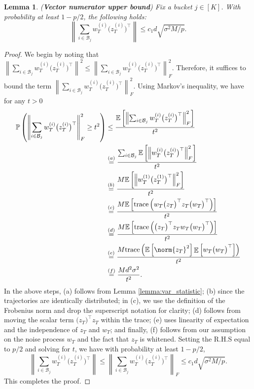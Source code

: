 \documentclass[letterpaper, 11 pt]{article}
\newcommand{\mc}{\mathcal}
\newcommand{\normlr}[1]{\left\lVert#1\right\rVert}
\newcommand{\tr}[1]{\text{trace}\left( #1 \right)}
\DeclareMathOperator{\E}{\mathbb{E}}
\newtheorem{lemma}{Lemma}
\begin{document}
\begin{lemma} (\textbf{Vector numerator upper bound}) Fix a bucket $j \in [K]$. With probability at least $1 - p/2$, the following holds:
$$\normlr{\sum_{i \in \mc{B}_j} w_T^{(i)}\big(z_T^{(i)}\big)^{\top}} \leq c_1 d \sqrt{\sigma^2 M/p}.$$
\end{lemma}
\begin{proof}
    We begin by noting that $\normlr{\sum_{i \in \mc{B}_j} w_T^{(i)}\big(z_T^{(i)}\big)^{\top}}^2 \leq \normlr{\sum_{i \in \mc{B}_j} w_T^{(i)}\big(z_T^{(i)}\big)^{\top}}_F^2$. Therefore, it suffices to bound the term $\normlr{\sum_{i \in \mc{B}_j} w_T^{(i)}\big(z_T^{(i)}\big)^{\top}}_F^2$. Using Markov's inequality, we have for any $t > 0$
    \begin{align}
        \mathbb{P}\left(\normlr{\sum_{i \in \mc{B}_j} w_T^{(i)}\big(z_T^{(i)}\big)^{\top}}_F^2 \geq t^2\right) & \leq 
        \frac{\mathbb{E}\left[ \normlr{\sum_{i \in \mc{B}_j} w_T^{(i)}\big(z_T^{(i)}\big)^{\top}}_F^2\right]}{t^2} \label{eqn:vec_num_1}\\
        & \overset{(a)}{=} \frac{\sum_{i \in \mc{B}_j} \mathbb{E}\left[ \normlr{w_T^{(i)}\big(z_T^{(i)}\big)^{\top}}_F^2\right]}{t^2} \nonumber\\
        & \overset{(b)}{=} \frac{M \mathbb{E}\left[ \normlr{w_T^{(1)}\big(z_T^{(1)}\big)^{\top}}_F^2\right]}{t^2} \nonumber\\
        & \overset{(c)}{=} \frac{M \mathbb{E}\left[ \tr{w_T\big(z_T\big)^{\top}z_T\big(w_T\big)^{\top}}\right]}{t^2} \nonumber\\
        & \overset{(d)}{=} \frac{M \mathbb{E}\left[ \tr{\big(z_T\big)^{\top}z_T w_T\big(w_T\big)^{\top}}\right]}{t^2} \nonumber\\
        & \overset{(e)}{=} \frac{M \tr{\mathbb{E}\left[ \norm{z_T}^2 \right] \E\left[w_T\big(w_T\big)^{\top} \right]}}{t^2} \nonumber\\
        & \overset{(f)}{=} \frac{M d^2 \sigma^2}{t^2}. \label{eqn:frob_norm_bnd}
    \end{align}
    In the above steps, (a) follows from Lemma \ref{lemma:var_statistic}; (b) since the trajectories are identically distributed; in (c), we use the definition of the Frobenius norm and drop the superscript notation for clarity; (d) follows from moving the scalar term $\big(z_T\big)^{\top}z_T$ within the trace; (e) uses linearity of expectation and the independence of $z_T$ and $w_T$; and finally, (f) follows from our assumption on the noise process $w_T$ and the fact that $z_T$ is whitened. Setting the R.H.S equal to $p/2$ and solving for $t$, we have with probability at least $1- p/2$, 
    \begin{equation}
        \normlr{\sum_{i \in \mc{B}_j} w_T^{(i)}\big(z_T^{(i)}\big)^{\top}} \leq \normlr{\sum_{i \in \mc{B}_j} w_T^{(i)}\big(z_T^{(i)}\big)^{\top}}_F \leq  c_1 d \sqrt{\sigma^2 M/p}.
    \end{equation}
    This completes the proof. 


\end{proof}
\end{document}
